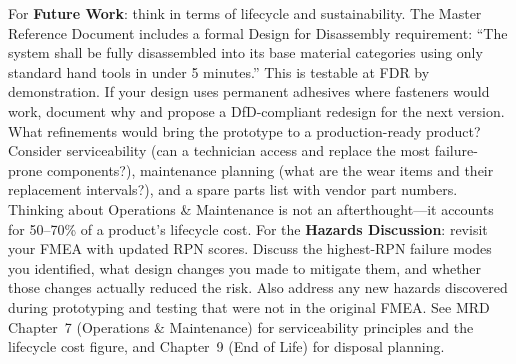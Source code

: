 \begin{faqbox}
For \textbf{Future Work}: think in terms of lifecycle and sustainability. The Master Reference Document includes a formal Design for Disassembly requirement: ``The system shall be fully disassembled into its base material categories using only standard hand tools in under 5 minutes.'' This is testable at FDR by demonstration. If your design uses permanent adhesives where fasteners would work, document why and propose a DfD-compliant redesign for the next version. What refinements would bring the prototype to a production-ready product? Consider serviceability (can a technician access and replace the most failure-prone components?), maintenance planning (what are the wear items and their replacement intervals?), and a spare parts list with vendor part numbers. Thinking about Operations \& Maintenance is not an afterthought---it accounts for 50--70\% of a product's lifecycle cost. For the \textbf{Hazards Discussion}: revisit your FMEA with updated RPN scores. Discuss the highest-RPN failure modes you identified, what design changes you made to mitigate them, and whether those changes actually reduced the risk. Also address any new hazards discovered during prototyping and testing that were not in the original FMEA. See MRD Chapter~7 (Operations \& Maintenance) for serviceability principles and the lifecycle cost figure, and Chapter~9 (End of Life) for disposal planning.
\end{faqbox}

